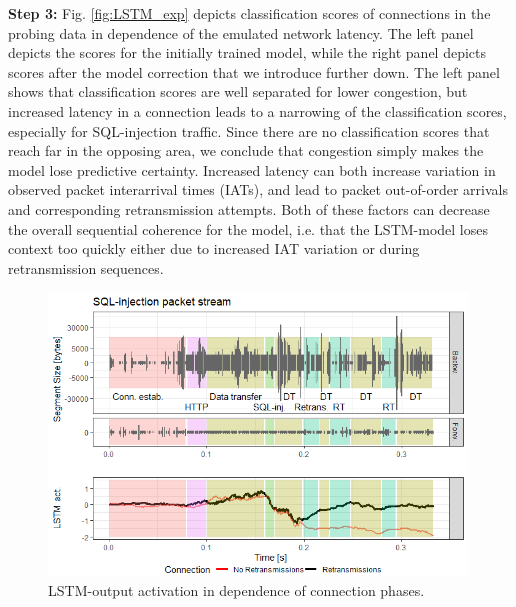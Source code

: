 \documentclass[runningheads]{llncs}
\begin{document}
\textbf{Step 3:} Fig. \ref{fig:LSTM_exp} depicts classification scores of connections in the probing data in dependence of the emulated network latency. The left panel depicts the scores for the initially trained model, while the right panel depicts scores after the model correction that we introduce further down. 
The left panel shows that classification scores are well separated for lower congestion, but increased latency in a connection leads to a narrowing of the classification scores, especially for SQL-injection traffic. Since there are no classification scores that reach far in the opposing area, we conclude that congestion simply makes the model lose predictive certainty. 
Increased latency can both increase variation in observed packet interarrival times (IATs), and lead to packet out-of-order arrivals and corresponding retransmission attempts. Both of these factors can decrease the overall sequential coherence for the model, i.e. that the LSTM-model loses context too quickly either due to increased IAT variation or during retransmission sequences. 


\begin{figure}
\centering
\includegraphics[width=0.99\textwidth]{images/LSTM_activation_new.png}
\caption{LSTM-output activation in dependence of connection phases.}\label{fig:LSTM_act}
\end{figure}
\end{document}
